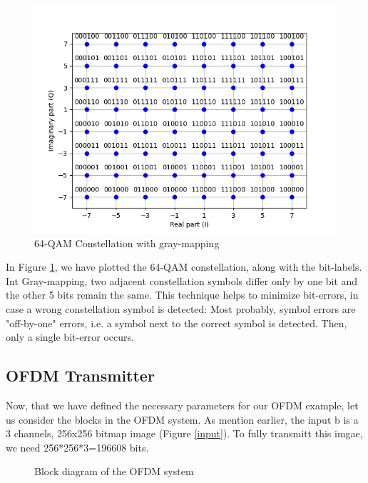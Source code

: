 \begin{figure}[ht]
    \centering
    \includegraphics[width=\textwidth]{../Source/results/mapping.png}
    \caption{64-QAM Constellation with gray-mapping}
    \label{mapping}
\end{figure}

In Figure \ref{mapping}, we have plotted the 64-QAM constellation, along with the bit-labels.
Int Gray-mapping, two adjacent constellation symbols differ only by one bit and the other 5 bits remain the same. This technique helps to minimize bit-errors, in case a wrong constellation symbol is detected: Most probably, symbol errors are "off-by-one" errors, i.e. a symbol next to the correct symbol is detected. Then, only a single bit-error occurs.

\subsection{OFDM Transmitter}

Now, that we have defined the necessary parameters for our OFDM example, let us consider the blocks in the OFDM system. As mention earlier, the input b is a 3 channels, 256x256 bitmap image (Figure \ref{input}). To fully transmitt this imgae, we need 256*256*3=196608 bits.

\begin{figure}[htbp]
    \centering
    
    \caption{Block diagram of the OFDM system}
    \label{Block diagram 2}
\end{figure}

